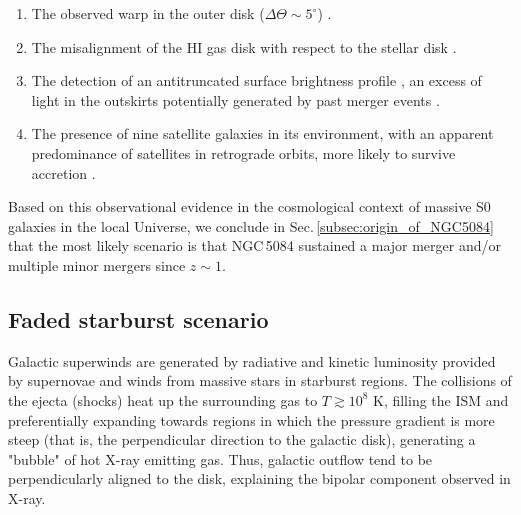 \documentclass[modern]{CORE-AAS/aastex631}
\begin{document}
{\begin{enumerate}
\item The observed warp in the outer disk ($\Delta\Theta\sim5^{\circ}$) \citep{zeilinger+1990mnras246_324}.

\item The misalignment of the HI gas disk with respect to the stellar disk \citep{gottesman+1986mnras219_759,zheng+2022afz22_085004}.
\item The detection of an antitruncated surface brightness profile \citep{comeron+2012apj759_98}, an excess of light in the outskirts potentially generated by past merger events \citep{younger+2007apj670_269, borlaff+2014aap570_103}.

\item The presence of nine satellite galaxies in its environment, with an apparent predominance of satellites in retrograde orbits, more likely to survive accretion \citep[see Fig.\,\ref{fig:NGC5084_environment}]{carignan+1997aj113_1585}.

\end{enumerate}

Based on this observational evidence in the cosmological context of massive S0 galaxies in the local Universe, we conclude in Sec.\,\ref{subsec:origin_of_NGC5084} that the most likely scenario is that NGC\,5084 sustained a major merger and/or multiple minor mergers since $z\sim1$.

\subsection{Faded starburst scenario}
\label{subsec:discussion_fadedstarburst}

Galactic superwinds \citep[][]{heckman+1993inproceedings_455} are generated by  radiative and kinetic luminosity provided by supernovae and winds from massive stars in starburst regions. The collisions of the ejecta (shocks) heat up the surrounding gas to $T\gtrsim10^{8}$ K, filling the ISM and preferentially expanding towards regions in which the pressure gradient is more steep (that is, the perpendicular direction to the galactic disk), generating a "bubble" of hot X-ray emitting gas. Thus, galactic outflow tend to be perpendicularly aligned to the disk, explaining the bipolar component observed in X-ray. 

}
\end{document}

